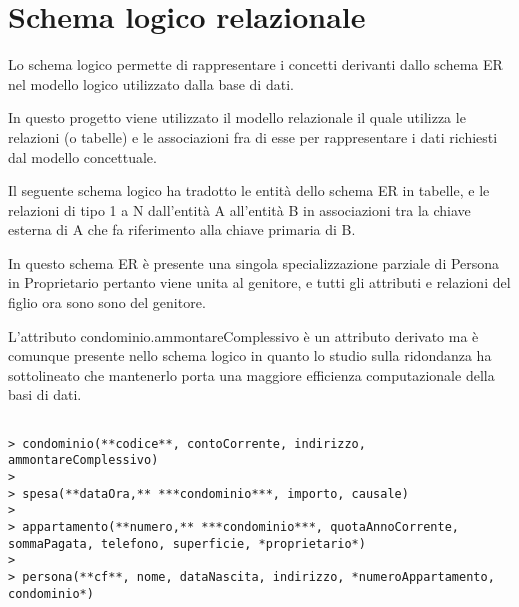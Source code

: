 \section{Schema logico relazionale}

Lo schema logico permette di rappresentare i concetti derivanti dallo schema ER
nel modello logico utilizzato dalla base di dati.

In questo progetto viene utilizzato il modello relazionale il quale utilizza le relazioni
(o tabelle) e le associazioni fra di esse per rappresentare i dati richiesti dal modello
concettuale.

Il seguente schema logico ha tradotto le entità dello schema ER in tabelle, e le relazioni
di tipo 1 a N dall'entità A all'entità B in associazioni tra la chiave esterna di A che
fa riferimento alla chiave primaria di B.

In questo schema ER è presente una singola specializzazione parziale di Persona in
Proprietario pertanto viene unita al genitore, e tutti gli attributi e relazioni del figlio
ora sono sono del genitore.

L'attributo condominio.ammontareComplessivo è un attributo derivato ma è comunque presente
nello schema logico in quanto lo studio sulla ridondanza ha sottolineato che mantenerlo porta
una maggiore efficienza computazionale della basi di dati.

\begin{verbatim}

> condominio(**codice**, contoCorrente, indirizzo, ammontareComplessivo)
>
> spesa(**dataOra,** ***condominio***, importo, causale)
>
> appartamento(**numero,** ***condominio***, quotaAnnoCorrente, sommaPagata, telefono, superficie, *proprietario*)
>
> persona(**cf**, nome, dataNascita, indirizzo, *numeroAppartamento, condominio*)

\end{verbatim}
